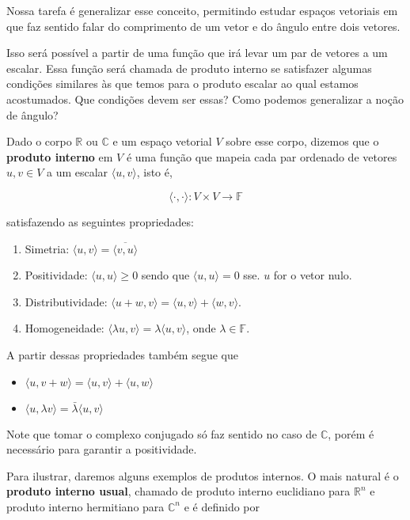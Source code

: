 \documentclass[12pt,a4paper]{article}
\begin{document}
Nossa tarefa é generalizar esse conceito, permitindo estudar espaços vetoriais em que faz sentido falar do comprimento de um vetor e do ângulo entre dois vetores.

Isso será possível a partir de uma função que irá levar um par de vetores a um escalar. Essa função será chamada de produto interno se satisfazer algumas condições similares às que temos para o produto escalar ao qual estamos acostumados. Que condições devem ser essas? Como podemos generalizar a noção de ângulo?

Dado o corpo $\mathbb{R}$ ou $\mathbb{C}$ e um espaço vetorial $V$ sobre esse corpo, dizemos que o \textbf{produto interno} em $V$ é uma função que mapeia cada par ordenado de vetores $u, v \in V$ a um escalar $\langle u, v \rangle$, isto é, 

\[
\langle \cdot ,  \cdot \rangle : V \times V \to \mathbb{F}
\]

satisfazendo as seguintes propriedades:

\begin{enumerate}
\item Simetria: $\langle u, v \rangle = \overline{\langle v, u \rangle}$
\item Positividade: $\langle u, u \rangle \geq 0$ sendo que $\langle u, u \rangle = 0$ sse. $u$ for o vetor nulo.
\item Distributividade: $\langle u+w,v \rangle = \langle u, v \rangle + \langle w, v \rangle.$
\item Homogeneidade: $\langle \lambda u, v \rangle = \lambda \langle u, v \rangle$, onde $\lambda \in \mathbb{F}$.
\end{enumerate}

A partir dessas propriedades também segue que 

\begin{itemize}
\item $\langle u, v+w \rangle = \langle u, v \rangle + \langle u, w \rangle$
\item $\langle u, \lambda v \rangle = \bar{\lambda} \langle u, v \rangle$
\end{itemize}

Note que tomar o complexo conjugado só faz sentido no caso de $\mathbb{C}$, porém é necessário para garantir a positividade. 

Para ilustrar, daremos alguns exemplos de produtos internos. O mais natural é o \textbf{produto interno usual}, chamado de produto interno euclidiano para $\mathbb{R}^n$ e produto interno hermitiano para $\mathbb{C}^n$ e é definido por
\end{document}
